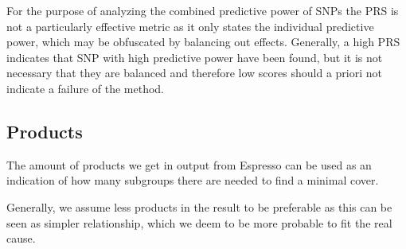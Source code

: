 \documentclass[letterpaper, 11pt]{article}
\begin{document}
\begin{figure} [!h] \end{figure}

For the purpose of analyzing the combined predictive power of SNPs the PRS is not a particularly effective metric as it only states the individual predictive power, which may be obfuscated by balancing out effects. Generally, a high PRS indicates that SNP with high predictive power have been found, but it is not necessary that they are balanced and therefore low scores should a priori not indicate a failure of the method. \\


\subsection{Products}
The amount of products we get in output from Espresso can be used as an indication of how many subgroups there are needed to find a minimal cover.

Generally, we assume less products in the result to be preferable as this can be seen as simpler relationship, which we deem to be more probable to fit the real cause. \\
\end{document}

